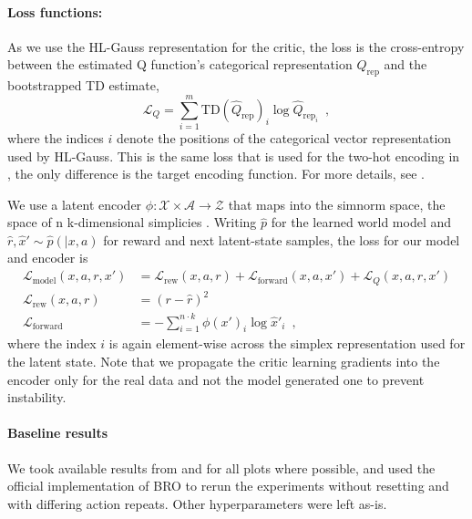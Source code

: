 \paragraph{Loss functions:} As we use the HL-Gauss representation \parencite{farebrother2024stop} for the critic, the loss is the cross-entropy between the estimated Q function's categorical representation $Q_\mathrm{rep}$ and the bootstrapped TD estimate,
$$\mathcal{L}_Q = \sum_{i=1}^m {\mathrm{TD}(\hat{Q}_\mathrm{rep})}_i \log \hat{Q}_{\mathrm{rep}_i}\enspace,$$
where the indices $i$ denote the positions of the categorical vector representation used by HL-Gauss.
This is the same loss that is used for the two-hot encoding in \textcite{hansen2024tdmpc}, the only difference is the target encoding function.
For more details, see \textcite{farebrother2024stop}.

We use a latent encoder $\phi: \mathcal{X} \times \mathcal{A} \rightarrow \mathcal{Z}$ that maps into the simnorm space, the space of n k-dimensional simplicies \parencite{lavoie2023simplicial}.
Writing $\hat{p}$ for the learned world model and \mbox{$\hat{r}, \hat{x}' \sim \hat{p}(|x,a)$} for reward and next latent-state samples, the loss for our model and encoder is
\begin{align}
    \mathcal{L}_\mathrm{model}(x,a,r,x') &= \mathcal{L}_\mathrm{rew}(x,a,r) + \mathcal{L}_\mathrm{forward}(x,a,x') + \mathcal{L}_Q(x,a,r,x')\\
    \mathcal{L}_\mathrm{rew}(x,a,r) &= \left( r - \hat{r} \right)^2 \\
    \mathcal{L}_\mathrm{forward} &= - \sum_{i=1}^{n \cdot k} \phi(x')_i \log \hat{x}'_i\enspace,
\end{align}
where the index $i$ is again element-wise across the simplex representation used for the latent state.
Note that we propagate the critic learning gradients into the encoder only for the real data and not the model generated one to prevent instability.

\paragraph{Baseline results}
We took available results from \textcite{nauman2024bigger} and \textcite{hansen2024tdmpc} for all plots where possible, and used the official implementation of BRO to rerun the experiments without resetting and with differing action repeats. 
Other hyperparameters were left as-is.

\label{app:setup}

